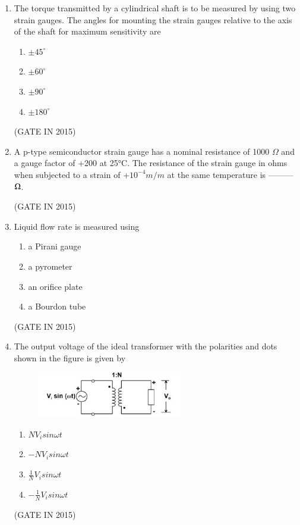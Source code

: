\documentclass[journal]{IEEEtran}
\begin{document}
\begin{enumerate}
\item The torque transmitted by a cylindrical shaft is to be measured by using two strain gauges. The angles for mounting the strain gauges relative to the axis of the shaft for maximum sensitivity are

\begin{multicols}{4}
\begin{enumerate}
\item $\pm 45^\circ$
\item $\pm 60^\circ$
\item $\pm 90^\circ$
\item $\pm 180^\circ$
\end{enumerate}
  \end{multicols} \hfill(GATE IN 2015)

\item A p-type semiconductor strain gauge has a nominal resistance of 1000 $\Omega$ and a gauge factor of +200 at 25°C. The resistance of the strain gauge in ohms when subjected to a strain of +$10^{-4} m/m$  at the same temperature is --------- $\ohm$.

 \hfill(GATE IN 2015)

\item Liquid flow rate is measured using

\begin{multicols}{2}
\begin{enumerate}
\item a Pirani gauge
\item a pyrometer
\item an orifice plate
\item a Bourdon tube
\end{enumerate}
  \end{multicols} \hfill(GATE IN 2015)

\item The output voltage of the ideal transformer with the polarities and dots shown in the figure is given by
\begin{figure}[H]
    \centering
      \includegraphics[width=0.6\textwidth]{4.png} 
      \caption{}
    \label{fig:fig4} 
\end{figure}
\begin{multicols}{4}
\begin{enumerate}
\item $NV_i sin \omega t$
\item $-NV_i sin\omega t$
\item $\frac{1}{N} V_i sin\omega t$
\item $-\frac{1}{N} V_i sin\omega t$
\end{enumerate}
  \end{multicols} \hfill(GATE IN 2015)


\end{enumerate}
\end{document}
